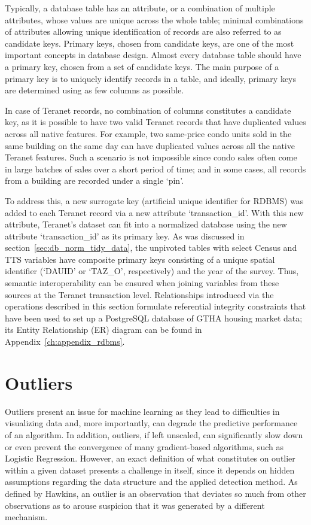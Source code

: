 Typically, a database table has an attribute, or a combination of multiple attributes, whose values are unique across the whole table;
minimal combinations of attributes allowing unique identification of records are also referred to as candidate keys.
Primary keys, chosen from candidate keys, are one of the most important concepts in database design.
Almost every database table should have a primary key, chosen from a set of candidate keys.
The main purpose of a primary key is to uniquely identify records in a table, and ideally, primary keys are determined using as few columns as possible.

In case of Teranet records, no combination of columns constitutes a candidate key, as it is possible to have two valid Teranet records that have duplicated values across all native features.
For example, two same-price condo units sold in the same building on the same day can have duplicated values across all the native Teranet features.
Such a scenario is not impossible since condo sales often come in large batches of sales over a short period of time;
and in some cases, all records from a building are recorded under a single `pin'.

To address this, a new surrogate key (artificial unique identifier for RDBMS) was added to each Teranet record via a new attribute `transaction\_id'.
With this new attribute, Teranet's dataset can fit into a normalized database using the new attribute `transaction\_id' as its primary key.
As was discussed in section~\ref{sec:db_norm_tidy_data}, the unpivoted tables with select Census and TTS variables have composite primary keys consisting of a unique spatial identifier (`DAUID' or `TAZ\_O', respectively) and the year of the survey.
Thus, semantic interoperability can be ensured when joining variables from these sources at the Teranet transaction level.
Relationships introduced via the operations described in this section formulate referential integrity constraints that have been used to set up a PostgreSQL database of GTHA housing market data;
its Entity Relationship (ER) diagram can be found in Appendix~\ref{ch:appendix_rdbms}.

\section{Outliers} \label{sec:outliers}

Outliers present an issue for machine learning as they lead to difficulties in visualizing data and, more importantly, can degrade the predictive performance of an algorithm.
In addition, outliers, if left unscaled, can significantly slow down or even prevent the convergence of many gradient-based algorithms, such as Logistic Regression\cite{Scikit-learndevelopers2019b}.
However, an exact definition of what constitutes on outlier within a given dataset presents a challenge in itself, since it depends on hidden assumptions regarding the data structure and the applied detection method\cite{Ben-Gal2005}.
As defined by Hawkins, an outlier is an observation that deviates so much from other observations as to arouse suspicion that it was generated by a different mechanism\cite{Hawkins1980}.

